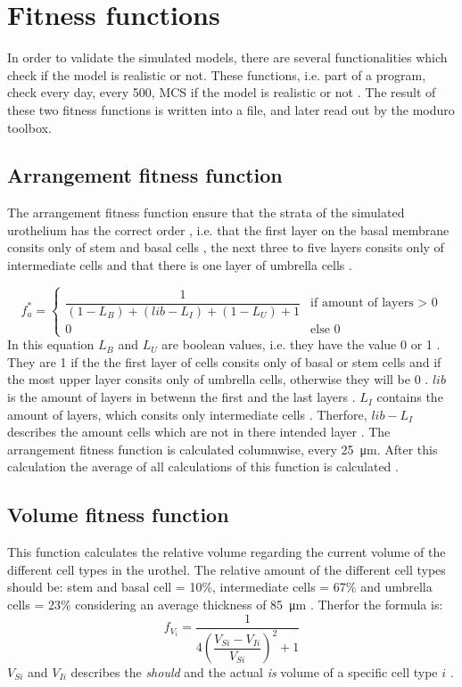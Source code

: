 \section{Fitness functions}
In order to validate the simulated models, there are several functionalities which check if the model is realistic or not. These functions, i.e. part of a program, check every day, every 500, \ac{MCS} if the model is realistic or not \cite{Torelli2017}. The result of these two fitness functions is written into a file, and later read out by the moduro toolbox.

\subsection{Arrangement fitness function}
The arrangement fitness function ensure that the strata of the simulated urothelium has the correct order \cite{Torelli2017}, i.e. that the first layer on the basal membrane consits only of stem and basal cells \cite{REFS}, the next three to five layers consits only of intermediate cells \cite{REFS} and that there is one layer of umbrella cells \cite{REFS}.

\begin{equation} 
f_{a}^{*} = \begin{cases}
\dfrac{1}{(1-L_{B})+(lib-L_{I})+(1-L_{U})+1} & \text{if amount of layers > 0} \\
0 & \text{else 0}
\end{cases}
\end{equation}
In this equation $L_{B}$ and $L_{U}$ are boolean values, i.e. they have the value 0 or 1 \cite{Torelli2017}. They are 1 if the the first layer of cells consits only of basal or stem cells and if the most upper layer consits only of umbrella cells, otherwise they will be 0 \cite{Torelli2017}.
$lib$ is the amount of layers in betwenn the first and the last layers \cite{Torelli2017}. $L_{I}$ contains the amount of layers, which consits only intermediate cells \cite{Torelli2017}. Therfore, $lib-L_{I}$ describes the amount cells which are not in there intended layer \cite{Torelli2017}. \newline
The arrangement fitness function is calculated columnwise, every \SI{25}{\micro\metre}. After this calculation the average of all calculations of this function is calculated \cite{Torelli2017}.

\subsection{Volume fitness function}
This function calculates the relative volume regarding the current volume of the different cell types in the urothel. The relative amount of the different cell types should be: stem and basal cell = 10\%, intermediate cells = 67\% and umbrella cells = 23\% considering an average thickness of \SI{85}{\micro\metre} \cite{Torelli2017}. Therfor the formula is:
\begin{equation} 
f_{V_{i}} = \dfrac{1}{4 (\dfrac{V_{Si}-V_{Ii}}{V_{Si}})^2 + 1}
\end{equation}
$V_{Si}$ and $V_{Ii}$ describes the \textit{should} and the actual \textit{is} volume of a specific cell type $i$ \cite{Torelli2017}. 

